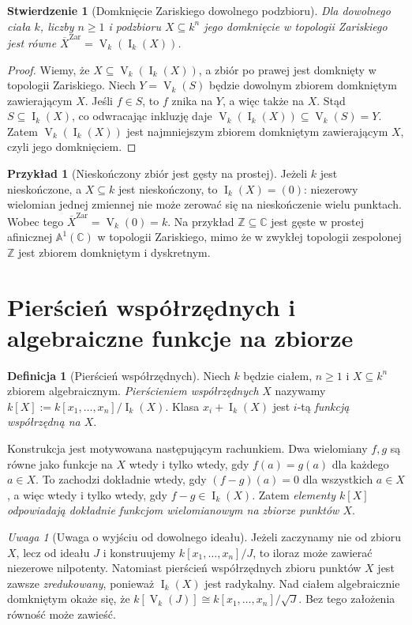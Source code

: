 \documentclass[11pt,a4paper,openany]{report}
\numberwithin{equation}{section}
\theoremstyle{plain}
\newtheorem{stwierdzenie}[twierdzenie]{Stwierdzenie}
\theoremstyle{definition}
\newtheorem{definicja}[twierdzenie]{Definicja}
\newtheorem{przyklad}[twierdzenie]{Przykład}
\theoremstyle{remark}
\newtheorem{uwaga}[twierdzenie]{Uwaga}
\newcommand{\Z}{\mathbb Z}
\newcommand{\C}{\mathbb C}
\newcommand{\A}{\mathbb A}
\newcommand{\V}{\operatorname V}
\newcommand{\I}{\operatorname I}
\begin{document}
\begin{stwierdzenie}[Domknięcie Zariskiego dowolnego podzbioru]
\label{st:closure}
Dla dowolnego ciała $k$, liczby $n\ge1$ i podzbioru
$X\subseteq k^n$ jego domknięcie w topologii Zariskiego jest równe
$\overline X^{\mathrm{Zar}}=\V_k(\I_k(X))$.
\end{stwierdzenie}
\begin{proof}
Wiemy, że $X\subseteq\V_k(\I_k(X))$, a zbiór po prawej
jest domknięty w topologii Zariskiego.
Niech $Y=\V_k(S)$ będzie dowolnym zbiorem domkniętym zawierającym $X$.
Jeśli $f\in S$, to $f$ znika na $Y$, a więc także na $X$.
Stąd $S\subseteq\I_k(X)$, co odwracając inkluzję daje
$\V_k(\I_k(X))\subseteq\V_k(S)=Y$.
Zatem $\V_k(\I_k(X))$ jest najmniejszym zbiorem domkniętym
zawierającym $X$, czyli jego domknięciem.
\end{proof}

\begin{przyklad}[Nieskończony zbiór jest gęsty na prostej]
Jeżeli $k$ jest nieskończone, a $X\subseteq k$ jest nieskończony,
to $\I_k(X)=(0)$: niezerowy wielomian jednej zmiennej nie może
zerować się na nieskończenie wielu punktach.
Wobec tego $\overline X^{\mathrm{Zar}}=\V_k(0)=k$.
Na przykład $\Z\subseteq\C$ jest gęste w prostej afinicznej
$\A^1(\C)$ w topologii Zariskiego, mimo że w zwykłej topologii
zespolonej $\Z$ jest zbiorem domkniętym i dyskretnym.
\end{przyklad}

\section{Pierścień współrzędnych i algebraiczne funkcje na zbiorze}

\begin{definicja}[Pierścień współrzędnych]
Niech $k$ będzie ciałem, $n\ge1$ i $X\subseteq k^n$ zbiorem
algebraicznym. \emph{Pierścieniem współrzędnych} $X$ nazywamy
$k[X]:=k[x_1,\dots,x_n]/\I_k(X)$.
Klasa $x_i+\I_k(X)$ jest $i$-tą \emph{funkcją współrzędną na $X$}.
\end{definicja}

Konstrukcja jest motywowana następującym rachunkiem. Dwa wielomiany
$f,g$ są równe jako funkcje na $X$ wtedy i tylko wtedy, gdy
$f(a)=g(a)$ dla każdego $a\in X$. To zachodzi dokładnie wtedy,
gdy $(f-g)(a)=0$ dla wszystkich $a\in X$, a więc wtedy i tylko wtedy,
gdy $f-g\in\I_k(X)$. Zatem \emph{elementy $k[X]$ odpowiadają dokładnie
funkcjom wielomianowym na zbiorze punktów $X$}.

\begin{uwaga}[Uwaga o wyjściu od dowolnego ideału]
Jeżeli zaczynamy nie od zbioru $X$, lecz od ideału $J$ i konstruujemy
$k[x_1,\dots,x_n]/J$, to iloraz może zawierać niezerowe nilpotenty.
Natomiast pierścień współrzędnych zbioru punktów $X$ jest zawsze
\emph{zredukowany}, ponieważ $\I_k(X)$ jest radykalny.
Nad ciałem algebraicznie domkniętym okaże się, że
$k[\V_k(J)]\cong k[x_1,\dots,x_n]/\sqrt J$.
Bez tego założenia równość może zawieść.
\end{uwaga}
\end{document}
